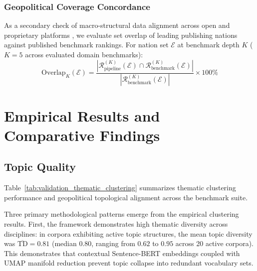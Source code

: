 \documentclass[preprint,12pt]{elsarticle}
\begin{document}
\subsubsection{Geopolitical Coverage Concordance}
As a secondary check of macro-structural data alignment across open and proprietary platforms \cite{visser2021large, martin2021google}, we evaluate set overlap of leading publishing nations against published benchmark rankings. For nation set $\mathcal{E}$ at benchmark depth $K$ ($K=5$ across evaluated domain benchmarks):
\begin{equation}
\text{Overlap}_K(\mathcal{E}) = \frac{|\mathcal{R}_{\text{pipeline}}^{(K)}(\mathcal{E}) \cap \mathcal{R}_{\text{benchmark}}^{(K)}(\mathcal{E})|}{|\mathcal{R}_{\text{benchmark}}^{(K)}(\mathcal{E})|} \times 100\%
\end{equation}

\section{Empirical Results and Comparative Findings}
\label{sec:results}

\subsection{Topic Quality}
Table~\ref{tab:validation_thematic_clustering} summarizes thematic clustering performance and geopolitical topological alignment across the benchmark suite.



Three primary methodological patterns emerge from the empirical clustering results. First, the framework demonstrates high thematic diversity across disciplines: in corpora exhibiting active topic structures, the mean topic diversity was $\overline{\text{TD}} = 0.81$ (median $0.80$, ranging from $0.62$ to $0.95$ across 20 active corpora). This demonstrates that contextual Sentence-BERT embeddings coupled with UMAP manifold reduction prevent topic collapse into redundant vocabulary sets. 
\end{document}
